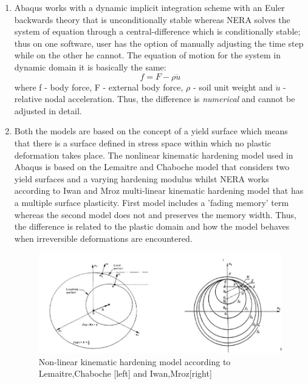 \documentclass[10pt,a4paper]{report}
\begin{document}
\begin{enumerate}
	\item Abaqus works with a dynamic implicit integration scheme with an Euler backwards theory that is unconditionally stable whereas NERA solves the system of equation through a central-difference which is conditionally stable; thus on one software, user has the option of manually adjusting the time step while on the other he cannot. The equation of motion for the system in dynamic domain it is basically the same:
	\begin{equation}
		f=F-\rho\ddot{u}
	\end{equation}
where f - body force, F - external body force, $\rho$ - soil unit weight and $\ddot{u}$ - relative nodal acceleration. Thus, the difference is \textit{numerical} and cannot be adjusted in detail.
\item Both the models are based on the concept of a yield surface which means that there is a surface defined in stress space within which no plastic deformation takes place. The nonlinear kinematic hardening model used in Abaqus is based on the Lemaitre and Chaboche model that considers two yield surfaces and a varying hardening modulus whilst NERA works according to Iwan and Mroz multi-linear kinematic hardening model that has a multiple surface plasticity. First model includes a 'fading memory' term whereas the second model does not and preserves the memory width. Thus, the difference is related to the plastic domain and how the model behaves when irreversible deformations are encountered. 
\begin{figure}
	\centering
	\includegraphics[width=0.7\linewidth]{"yield_srf"}
	\caption{Non-linear kinematic hardening model according to Lemaitre,Chaboche [left] and Iwan,Mroz[right]}
	\label{Yield}
\end{figure}

\end{enumerate}
\end{document}
